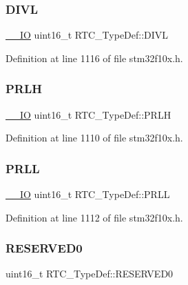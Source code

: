 \subsubsection{\texorpdfstring{D\+I\+VL}{DIVL}}
{\footnotesize\ttfamily \hyperlink{core__sc300_8h_aec43007d9998a0a0e01faede4133d6be}{\+\_\+\+\_\+\+IO} uint16\+\_\+t R\+T\+C\+\_\+\+Type\+Def\+::\+D\+I\+VL}



Definition at line 1116 of file stm32f10x.\+h.

\mbox{\label{struct_r_t_c___type_def_a831b0b55bae7921faa7d16c6f3160449}} 
\subsubsection{\texorpdfstring{P\+R\+LH}{PRLH}}
{\footnotesize\ttfamily \hyperlink{core__sc300_8h_aec43007d9998a0a0e01faede4133d6be}{\+\_\+\+\_\+\+IO} uint16\+\_\+t R\+T\+C\+\_\+\+Type\+Def\+::\+P\+R\+LH}



Definition at line 1110 of file stm32f10x.\+h.

\mbox{\label{struct_r_t_c___type_def_a03cf96aff11c288096d30a66afd19899}} 
\subsubsection{\texorpdfstring{P\+R\+LL}{PRLL}}
{\footnotesize\ttfamily \hyperlink{core__sc300_8h_aec43007d9998a0a0e01faede4133d6be}{\+\_\+\+\_\+\+IO} uint16\+\_\+t R\+T\+C\+\_\+\+Type\+Def\+::\+P\+R\+LL}



Definition at line 1112 of file stm32f10x.\+h.

\mbox{\label{struct_r_t_c___type_def_a6d55bb337c409f849725a774364ce3bc}} 
\subsubsection{\texorpdfstring{R\+E\+S\+E\+R\+V\+E\+D0}{RESERVED0}}
{\footnotesize\ttfamily uint16\+\_\+t R\+T\+C\+\_\+\+Type\+Def\+::\+R\+E\+S\+E\+R\+V\+E\+D0}



